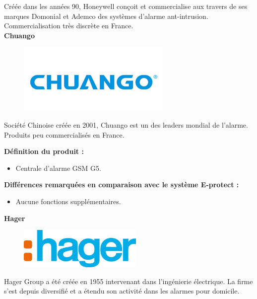 Créée dans les années 90, Honeywell conçoit et commercialise aux travers de ses marques Domonial et Ademco des systèmes d'alarme ant-intrusion.\\
Commercialisation très discrète en France.\\

\textbf{Chuango}\\
\begin{figure}[h!]
	\begin{center}
		\includegraphics[width=0.4\linewidth]{../images/chuango}
	\end{center}
	\caption{\cite{www:chuango}}
\end{figure}

Société Chinoise créée en 2001, Chuango est un des leaders mondial de l'alarme.\\
Produits peu commercialisés en France. 

\textbf{Définition du produit :}
\begin{itemize}
\item Centrale d'alarme GSM G5.
\end{itemize}

\textbf{Différences remarquées en comparaison avec le système E-protect :}
\begin{itemize}
\item Aucune fonctions supplémentaires.\\
\end{itemize}

\textbf{Hager}\\
\begin{figure}[h!]
	\begin{center}
		\includegraphics[width=0.4\linewidth]{../images/hager}
	\end{center}
	\caption{\cite{www:hager}}
\end{figure}

Hager Group a été créée en 1955 intervenant dans l'ingénierie électrique. La firme s'est depuis diversifié et a étendu son activité dans les alarmes pour domicile.

